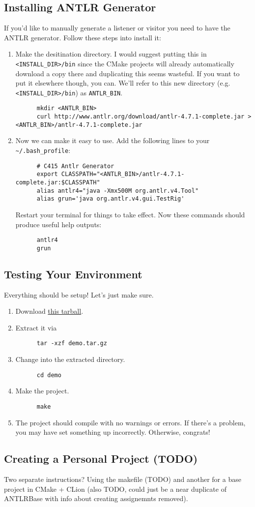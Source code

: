\documentclass[../setup.tex]{subfiles}
\begin{document}
\subsection{Installing ANTLR Generator}
If you'd like to manually generate a listener or visitor you need to have the ANTLR generator.
Follow these steps into install it:
\begin{enumerate}
  \item
    Make the desitination directory. I would suggest putting this in \lstinline{<INSTALL_DIR>/bin}
    since the CMake projects will already automatically download a copy there and duplicating
    this seems wasteful. If you want to put it elsewhere though, you can. We'll refer to this new
    directory (e.g. \lstinline{<INSTALL_DIR>/bin}) as \lstinline{ANTLR_BIN}.
    \begin{lstlisting}
      mkdir <ANTLR_BIN>
      curl http://www.antlr.org/download/antlr-4.7.1-complete.jar > <ANTLR_BIN>/antlr-4.7.1-complete.jar
    \end{lstlisting}
  \item
    Now we can make it easy to use. Add the following lines to your \lstinline{~/.bash_profile}:
    \begin{lstlisting}
      # C415 Antlr Generator
      export CLASSPATH="<ANTLR_BIN>/antlr-4.7.1-complete.jar:$CLASSPATH"
      alias antlr4="java -Xmx500M org.antlr.v4.Tool"
      alias grun='java org.antlr.v4.gui.TestRig'
    \end{lstlisting}
    Restart your terminal for things to take effect. Now these commands should produce useful help
    outputs:
    \begin{lstlisting}
      antlr4
      grun
    \end{lstlisting}
\end{enumerate}

\subsection{Testing Your Environment}
Everything should be setup! Let's just make sure.
\begin{enumerate}
  \item
    Download \href{https://webdocs.cs.ualberta.ca/~c415/setup/static/demo.tar.gz} {this tarball}.
  \item
    Extract it via
    \begin{lstlisting}
      tar -xzf demo.tar.gz
    \end{lstlisting}
  \item
    Change into the extracted directory.
    \begin{lstlisting}
      cd demo
    \end{lstlisting}
  \item
    Make the project.
    \begin{lstlisting}
      make
    \end{lstlisting}
  \item
    The project should compile with no warnings or errors. If there's a problem, you may have set
    something up incorrectly. Otherwise, congrats!
\end{enumerate}

\subsection{Creating a Personal Project (TODO)}
Two separate instructions? Using the makefile (TODO) and another for a base project in CMake +
CLion (also TODO, could just be a near duplicate of ANTLRBase with info about creating assignemnts
removed).
\end{document}
